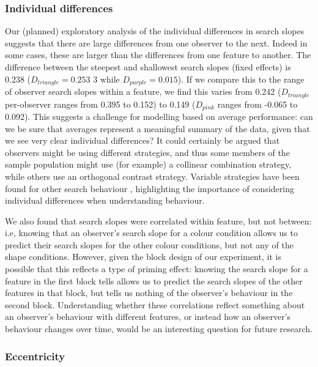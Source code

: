 \documentclass[preprint,12pt,authoryear]{elsarticle}
\begin{document}
\subsubsection{Individual differences}

Our (planned) exploratory analysis of the individual differences in search slopes suggests that there are large differences from one observer to the next. Indeed in some cases, these are larger than the differences from one feature to another. The difference between the steepest and shallowest search slopes (fixed effects) is 0.238 ($D_{triangle} = 0.253$ 3 while $D_{purple} = 0.015$). If we compare this to the range of observer search slopes within a feature, we find this varies from 0.242 ($D_{triangle}$ per-observer ranges from 0.395 to 0.152) to 0.149 ($D_{pink}$ ranges from -0.065 to 0.092). This suggests a challenge for modelling based on average performance: can we be sure that averages represent a meaningful summary of the data, given that we see very clear individual differences? It could certainly be argued that observers might be using different strategies, and thus some members of the sample population might use (for example) a collinear combination strategy, while others use an orthogonal contrast strategy. Variable strategies have been found for other search behaviour \citep{clarke2022stable, kristjansson2014common, proulx2011individual, li2022assessing}, highlighting the importance of considering individual differences when understanding behaviour.

We also found that search slopes were correlated within feature, but not between:  i.e, knowing that an observer's search slope for a colour condition allows us to predict their search slopes for the other colour conditions, but not any of the shape conditions. However, given the block design of our experiment, it is possible that this reflects a type of priming effect: knowing the search slope for a feature in the first block tells allows us to predict the search slopes of the other features in that block, but tells us nothing of the observer's behaviour in the second block. Understanding whether these correlations reflect something about an observer's behaviour with different features, or instead how an observer's behaviour changes over time, would be an interesting question for future research.

\subsubsection{Eccentricity}
\end{document}

